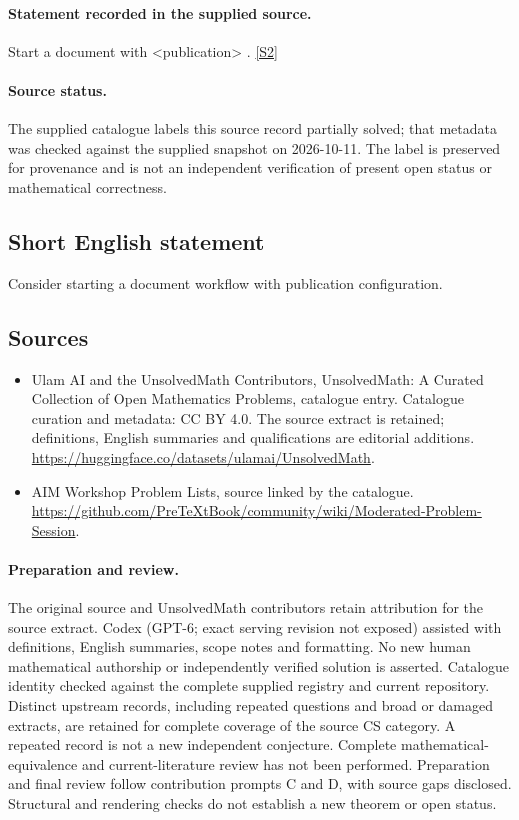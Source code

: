 \documentclass[11pt]{article}
\begin{document}
\paragraph{Statement recorded in the supplied source.}
Start a document with <publication> . \href{https://github.com/PreTeXtBook/community/wiki/Moderated-Problem-Session}{[S2]}
\paragraph{Source status.}
The supplied catalogue labels this source record partially solved; that metadata was checked against the supplied snapshot on 2026-10-11. The label is preserved for provenance and is not an independent verification of present open status or mathematical correctness.
\subsection{Short English statement}
Consider starting a document workflow with publication configuration.
\subsection{Sources}
\begin{itemize}
\item[S1] Ulam AI and the UnsolvedMath Contributors, UnsolvedMath: A Curated Collection of Open Mathematics Problems, catalogue entry. Catalogue curation and metadata: CC BY 4.0. The source extract is retained; definitions, English summaries and qualifications are editorial additions.
\url{https://huggingface.co/datasets/ulamai/UnsolvedMath}.
\item[S2] AIM Workshop Problem Lists, source linked by the catalogue.
\url{https://github.com/PreTeXtBook/community/wiki/Moderated-Problem-Session}.
\end{itemize}
\paragraph{Preparation and review.}
The original source and UnsolvedMath contributors retain attribution for the source extract. Codex (GPT-6; exact serving revision not exposed) assisted with definitions, English summaries, scope notes and formatting. No new human mathematical authorship or independently verified solution is asserted. Catalogue identity checked against the complete supplied registry and current repository. Distinct upstream records, including repeated questions and broad or damaged extracts, are retained for complete coverage of the source CS category. A repeated record is not a new independent conjecture. Complete mathematical-equivalence and current-literature review has not been performed. Preparation and final review follow contribution prompts C and D, with source gaps disclosed. Structural and rendering checks do not establish a new theorem or open status.
\label{end:statement}
\end{document}
